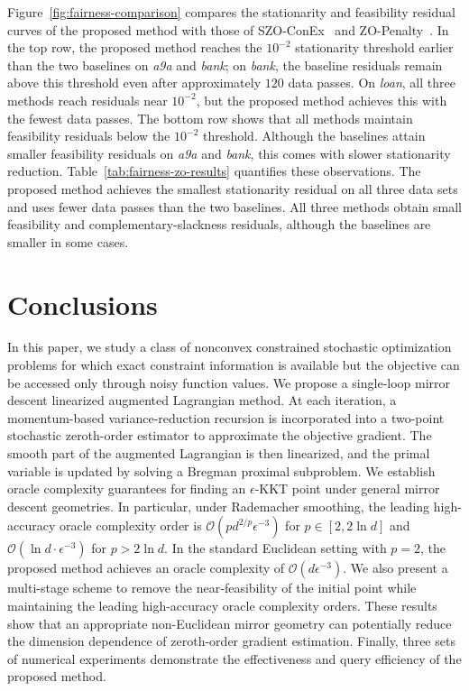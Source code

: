 \documentclass[11pt]{article}
\numberwithin{equation}{section}
\begin{document}
Figure~\ref{fig:fairness-comparison} compares the stationarity and feasibility residual curves of the proposed method with those of SZO-ConEx~\cite{nguyen2022stochastic} and ZO-Penalty~\cite{wang2017penalty}. In the top row, the proposed method reaches the $10^{-2}$ stationarity threshold earlier than the two baselines on \textit{a9a} and \textit{bank}; on \textit{bank}, the baseline residuals remain above this threshold even after approximately $120$ data passes. On \textit{loan}, all three methods reach residuals near $10^{-2}$, but the proposed method achieves this with the fewest data passes.  The bottom row shows that all methods maintain feasibility residuals below the $10^{-2}$ threshold. Although the baselines attain smaller feasibility residuals on \textit{a9a} and \textit{bank}, this comes with slower stationarity reduction. Table~\ref{tab:fairness-zo-results} quantifies these observations. The proposed method achieves the smallest stationarity residual on all three data sets and uses fewer data passes than the two baselines. All three methods obtain small feasibility and complementary-slackness residuals, although the baselines are smaller in some cases. %


\section{Conclusions}
\label{sec:conclusions}
In this paper, we study a class of nonconvex constrained stochastic optimization problems for which exact constraint information is available but the objective can be accessed only through noisy function values. We propose a single-loop mirror descent linearized augmented Lagrangian method. At each iteration, a momentum-based variance-reduction recursion is incorporated into  a two-point stochastic zeroth-order estimator to approximate the objective gradient. The smooth part of the augmented Lagrangian is then linearized, and the primal variable is updated by solving a Bregman proximal subproblem. We establish oracle complexity guarantees for finding an $\epsilon$-KKT point under general mirror descent geometries. In particular, under Rademacher smoothing, the leading high-accuracy oracle complexity order is 
\(\mathcal{O}(p d^{2/p}\epsilon^{-3})\) for \(p\in[2,2\ln d]\) and
\(\mathcal{O}(\ln d\cdot\epsilon^{-3})\) for \(p>2\ln d\).
In the standard Euclidean setting with \(p=2\), the proposed method achieves an oracle complexity of
\(\mathcal{O}(d\epsilon^{-3})\). We also present a multi-stage scheme to remove the near‑feasibility of the initial point while maintaining the leading high-accuracy oracle complexity orders. 
These results show that an appropriate non-Euclidean mirror geometry can potentially reduce the dimension dependence of zeroth-order gradient estimation. Finally, three sets of numerical experiments demonstrate the effectiveness and query efficiency of the proposed method.
\end{document}
